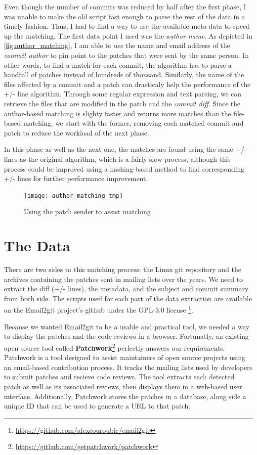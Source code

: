 Even though the number of commits was reduced by half after the first phase, I was unable to make the old script fast enough to parse the rest of the data in a timely fashion. Thus, I had to find a way to use the available meta-data to speed up the matching. The first data point I used was the \textit{author name}. As depicted in \autoref{fig:author_matching}, I am able to use the name and email address of the \textit{commit author} to pin point to the patches that were sent by the same person. In other words, to find a match for each commit, the algorithm has to parse a handfull of patches instead of hundreds of thousand. Similarly, the name of the files affected by a commit and a patch can drasticaly help the performance of the +/- line algorithm. Through some regular expression and text parsing, we can retrieve the files that are modified in the patch and the \textit{commit diff}. Since the author-based matching is slighty faster and returns more matches than the file-based matching, we start with the former, removing each matched commit and patch to reduce the workload of the next phase.

In this phase as well as the next one, the matches are found using the same +/- lines as the original algorithm, which is a fairly slow process, although this process could be improved using a hashing-based method to find corresponding +/- lines for further performance improvement. 



\begin{figure}[htb]
\centering
\texttt{[image: author\_matching\_tmp]}
\caption{Using the patch sender to assist matching}
\label{fig:author_matching}
\end{figure}


\section{The Data}

There are two sides to this matching process: the Linux git repository and the archives containing the patches sent in mailing lists over the years. We need to extract the diff (+/- lines), the metadata, and the subject and commit summary from both side. The scripts used for each part of the data extraction are available on the Email2git project's github under the GPL-3.0 license \footnote{\url{https://github.com/alexcourouble/email2git}}.

Because we wanted Email2git to be a usable and practical tool, we needed a way to display the patches and the code reviews in a browser. Fortunatly, an existing open-source tool called \textbf{Patchwork}\footnote{\url{https://github.com/getpatchwork/patchwork}} perfectly answers our requirements. Patchwork is a tool designed to assist maintainers of open source projects using an email-based contribution process. It tracks the mailing lists used by developers to submit patches and recieve code reviews. The tool extracts each detected patch as well as its associated reviews, then displays them in a web-based user interface. Additionally, Patchwork stores the patches in a database, along side a unique ID that can be used to generate a URL to that patch.

